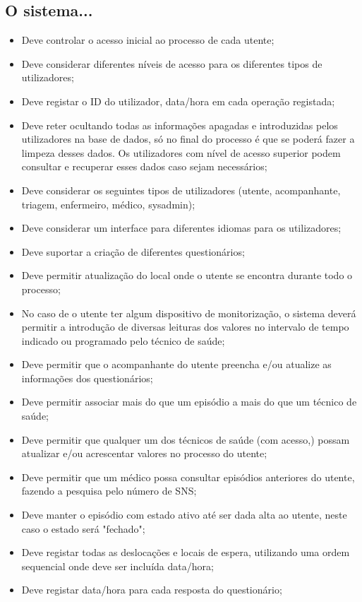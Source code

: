 \subsection{O sistema...}
\begin{itemize}
	\item Deve controlar o acesso inicial ao processo de cada utente;
	\item Deve considerar diferentes níveis de acesso para os diferentes tipos de utilizadores;
	\item Deve registar o ID do utilizador, data/hora em cada operação registada;
	\item Deve reter ocultando todas as informações apagadas e introduzidas pelos utilizadores na base de dados, só no final do processo é que se poderá fazer a limpeza desses dados. Os utilizadores com nível de acesso superior podem consultar e recuperar esses dados caso sejam necessários;
	\item Deve considerar os seguintes tipos de utilizadores (utente, acompanhante, triagem, enfermeiro, médico, sysadmin);
	\item Deve considerar um interface para diferentes idiomas para os utilizadores;
	\item Deve suportar a criação de diferentes questionários;
	\item Deve permitir atualização do local onde o utente se encontra durante todo o processo;
	\item No caso de o utente ter algum dispositivo de monitorização, o sistema deverá permitir a introdução de diversas leituras dos valores no intervalo de tempo indicado ou programado pelo técnico de saúde;
	\item Deve permitir que o acompanhante do utente preencha e/ou atualize as informações dos questionários;
	\item Deve permitir associar mais do que um episódio a mais do que um técnico de saúde;
	\item Deve permitir que qualquer um dos técnicos de saúde (com acesso,) possam atualizar e/ou acrescentar valores no processo do utente;
	\item Deve permitir que um médico possa consultar episódios anteriores do utente, fazendo a pesquisa pelo número de SNS;
	\item Deve manter o episódio com estado ativo até ser dada alta ao utente, neste caso o estado será "fechado";
	\item Deve registar todas as deslocações e locais de espera, utilizando uma ordem sequencial onde deve ser incluída data/hora;
	\item Deve registar data/hora para cada resposta do questionário;
\end{itemize}



